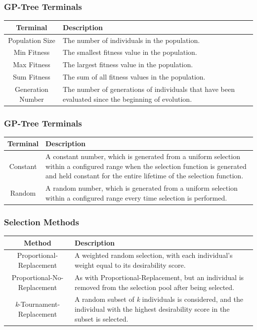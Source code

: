 \documentclass{beamer}
\begin{document}
\begin{frame}
\frametitle{GP-Tree Terminals}

\begin{table}
	\centering
	\label{tab:gp-terminals}
	\begin{tabular}{c|p{6cm}}
		\hline
		Terminal & Description\\
		\hline
		Population Size &  The number of individuals in the population. \\
		\hline
		Min Fitness &  The smallest fitness value in the population. \\
		\hline
		Max Fitness &  The largest fitness value in the population. \\ 
		\hline
		Sum Fitness &  The sum of all fitness values in the population. \\
		\hline
		Generation Number &  The number of generations of individuals that have been evaluated since the beginning of evolution. \\
		\hline
	\end{tabular}
\end{table}
\end{frame}		

\begin{frame}
\frametitle{GP-Tree Terminals}
\begin{table}
	\centering
	\label{tab:gp-terminals}
	\begin{tabular}{c|p{6cm}}
		\hline
		Terminal & Description\\
		\hline
		Constant &  A constant number, which is generated from a uniform selection within a configured range when the selection function is generated and held constant for the entire lifetime of the selection function. \\
		\hline
		Random &  A random number, which is generated from a uniform selection within a configured range every time selection is performed. \\                
		\hline
	\end{tabular}
\end{table}
\end{frame}
	
\begin{frame}
\frametitle{Selection Methods}
\begin{table}
	\centering
	\label{tab:selection_methods}
	\begin{tabular}{c|p{5cm}}
		\hline
		Method & Description\\
		\hline
		Proportional-Replacement & A weighted random selection, with each individual's weight equal to its desirability score. \\
		\hline
		Proportional-No-Replacement & As with Proportional-Replacement, but an individual is removed from the selection pool after being selected.\\
		\hline
		\textit{k}-Tournament-Replacement& A random subset of \textit{k} individuals is considered, and the individual with the highest desirability score in the subset is selected. \\
		\hline
	\end{tabular}
\end{table}
\end{frame}	
\end{document}
